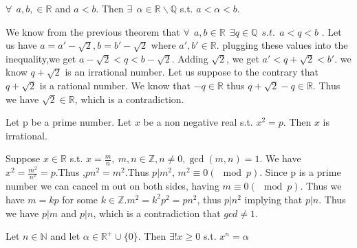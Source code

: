 \documentclass{scrartcl}
\begin{document}
    \begin{theorem}
        $\forall ~~ a,b,\in \mathbb{R}$ and $a<b$. Then $\exists ~~\alpha\in \mathbb{R}\backslash\mathbb{Q}$ s.t. $a<\alpha<b$.
    \end{theorem}
    \begin{proof*}
        We know from the previous theorem that $\forall ~~ a,b\in \mathbb{R} ~~\exists q \in \mathbb{Q} ~~s.t.~~ a<q<b$ . Let us have $a=a'-\sqrt{2},b=b'-\sqrt{2}$ where 
        $a',b' \in \mathbb{R}$. plugging these values into the inequality,we get $a-\sqrt{2}<q<b-\sqrt{2}$. Adding $\sqrt{2}$, we get $a'<q+\sqrt{2}<b'$. we know $q+\sqrt{2}$ is an 
        irrational number. Let us suppose to the contrary that $q+\sqrt{2}$ is a rational number. We know that $-q\in \mathbb{R}$ thus $q+\sqrt{2}-q\in \mathbb{R}$. Thus we have 
        $\sqrt{2} \in \mathbb{R}$, which is a contradiction. 
    \end{proof*}
    \begin{theorem}
        Let p be a prime number. Let $x$ be a non negative real s.t. $x^2=p$. Then $x$ is irrational.
    \end{theorem}
    \begin{proof*}
        Suppose $x \in \mathbb{R}$ s.t. $x=\frac{m}{n},~m,n\in \mathbb{Z},n\neq0,\gcd(m,n)=1$. We have $x^2 = \frac{m^2}{n^2}=p$.Thus ,$pn^2=m^2$.Thus $p|m^2$, $m^2\equiv0(\mod p)$. 
        Since p is a prime number we can cancel m out on both sides, having $m\equiv0(\mod p)$. Thus we have $m=kp$ for some $k\in \mathbb{Z}$.$m^2=k^2p^2=pn^2$, thus $p|n^2$ implying that 
        $p|n$. Thus we have $p|m$ and $p|n$, which is a contradiction that $gcd\neq1$.
    \end{proof*}
    \begin{theorem}
        Let $n\in\mathbb{N}$ and let $\alpha\in\mathbb{R}^+\cup\{0\}$. Then $\exists!x\geq0$ s.t. $x^n=\alpha$
    \end{theorem}
\end{document}
